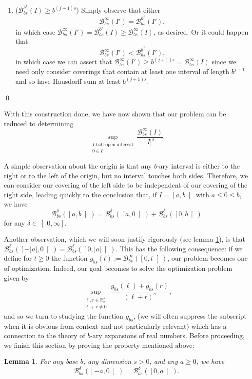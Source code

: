\documentclass[11pt, reqno]{amsart}
\newcommand{\R}{\mathbb{R}}
\newcommand{\BB}{\mathcal{B}}
\newtheorem{lemma}{Lemma}
\begin{document}
\begin{enumerate}[label=\textbf{Case \arabic*:}]
\begin{enumerate}[label=\textbf{Subcase \roman*)}]
\item ($\BB_{bs}^{b^j}(I) \geq b^{(j+1)s}$) Simply observe that either
\[\BB_{bs}^\infty(I') = \BB_{bs}^{b^j}(I'),\]
in which case $\BB_{bs}^\infty(I') = \BB_{bs}^{b^j}(I) \geq \BB_{bs}^\infty(I)$, as desired.
Or it could happen that
\[\BB_{bs}^\infty(I') < \BB_{bs}^{b^j}(I'),\]
in which case we can assert that $\BB_{bs}^\infty(I') \geq b^{(j+1)s} = \BB_{bs}^\infty(I)$ since we need only consider coverings that contain at least one interval of length $b^{j+1}$ and so have Hausdorff sum  at least $b^{(j+1)s}$.
\end{enumerate}
\end{enumerate}

\qed

With this construction done, we have now shown that our problem can be reduced to determining
\[\sup_{\substack{\text{$I$ half-open interval}\\ 0 \in I}} \frac{\BB_{bs}^\infty(I)}{\lvert I \rvert^s}.\]

A simple observation about the origin is that any $b$-ary interval is either to the right or to the left of the origin, but no interval touches both sides. Therefore, we can consider our covering of the left side to be independent of our covering of the right side, leading quickly to the conclusion that, if $I = \left[ a, b \right[$ with $a \leq 0 \leq b$, we have
\[\BB_{bs}^\delta(\left[a, b\right[) = \BB_{bs}^\delta(\left[a, 0\right[) + \BB_{bs}^\delta(\left[0, b\right[)\]
for any $\delta \in \left]0, \infty \right]$.

Another observation, which we will soon justify rigorously (see lemma \ref{sidedoesntmatter}), is that $\BB_{bs}^\delta(\left[-\lvert a\rvert, 0\right[) = \BB_{bs}^\delta(\left[0, \lvert a\rvert\right[)$. This has the following consequence: if we define for $t \geq 0$ the function $g_{bs}(t) := \BB_{bs}^\infty(\left[0, t \right[)$, our problem becomes one of optimization. Indeed, our goal becomes to solve the optimization problem given by
\[ \sup_{\substack{\ell,r \in \R^+_0\\\ell+r \neq 0}} \frac{g_{bs}(\ell) + g_{bs}(r)}{(\ell + r)^s}, \]
and so we turn to studying the function $g_{bs}$, (we will often suppress the subscript when it is obvious from context and not particularly relevant) which has a connection to the theory of $b$-ary expansions of real numbers. Before proceeding, we finish this section by proving the property mentioned above:

\begin{lemma} \label{sidedoesntmatter}
For any base $b$, any dimension $s > 0$, and any $a \geq 0$, we have
\[\BB_{bs}^\delta(\left[-a, 0\right[) = \BB_{bs}^\delta(\left[0, a\right[).\]
\end{lemma}
\end{document}
